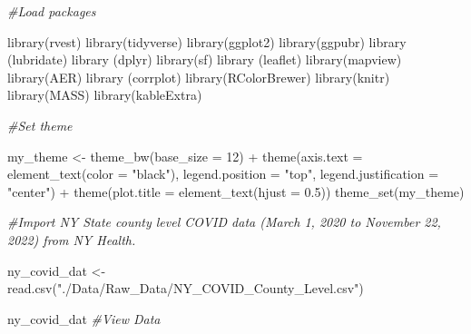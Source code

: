 \documentclass[
  12pt,
]{article}
\newenvironment{Shaded}{\begin{snugshade}}{\end{snugshade}}
\newcommand{\AttributeTok}[1]{\textcolor[rgb]{0.77,0.63,0.00}{#1}}
\newcommand{\CommentTok}[1]{\textcolor[rgb]{0.56,0.35,0.01}{\textit{#1}}}
\newcommand{\DecValTok}[1]{\textcolor[rgb]{0.00,0.00,0.81}{#1}}
\newcommand{\FloatTok}[1]{\textcolor[rgb]{0.00,0.00,0.81}{#1}}
\newcommand{\FunctionTok}[1]{\textcolor[rgb]{0.00,0.00,0.00}{#1}}
\newcommand{\NormalTok}[1]{#1}
\newcommand{\OtherTok}[1]{\textcolor[rgb]{0.56,0.35,0.01}{#1}}
\newcommand{\SpecialCharTok}[1]{\textcolor[rgb]{0.00,0.00,0.00}{#1}}
\newcommand{\StringTok}[1]{\textcolor[rgb]{0.31,0.60,0.02}{#1}}
\begin{document}
\begin{Shaded}
\begin{Highlighting}[]
\CommentTok{\#Load packages}

\FunctionTok{library}\NormalTok{(rvest)}
\FunctionTok{library}\NormalTok{(tidyverse)}
\FunctionTok{library}\NormalTok{(ggplot2)}
\FunctionTok{library}\NormalTok{(ggpubr)}
\FunctionTok{library}\NormalTok{ (lubridate)}
\FunctionTok{library}\NormalTok{ (dplyr)}
\FunctionTok{library}\NormalTok{(sf)}
\FunctionTok{library}\NormalTok{ (leaflet)}
\FunctionTok{library}\NormalTok{(mapview)}
\FunctionTok{library}\NormalTok{(AER)}
\FunctionTok{library}\NormalTok{ (corrplot)}
\FunctionTok{library}\NormalTok{(RColorBrewer)}
\FunctionTok{library}\NormalTok{(knitr)}
\FunctionTok{library}\NormalTok{(MASS)}
\FunctionTok{library}\NormalTok{(kableExtra)}

\CommentTok{\#Set theme}

\NormalTok{my\_theme }\OtherTok{\textless{}{-}} \FunctionTok{theme\_bw}\NormalTok{(}\AttributeTok{base\_size =} \DecValTok{12}\NormalTok{) }\SpecialCharTok{+} 
  \FunctionTok{theme}\NormalTok{(}\AttributeTok{axis.text =} \FunctionTok{element\_text}\NormalTok{(}\AttributeTok{color =} \StringTok{"black"}\NormalTok{), }
      \AttributeTok{legend.position =} \StringTok{"top"}\NormalTok{, }\AttributeTok{legend.justification =} \StringTok{"center"}\NormalTok{) }\SpecialCharTok{+}
  \FunctionTok{theme}\NormalTok{(}\AttributeTok{plot.title =} \FunctionTok{element\_text}\NormalTok{(}\AttributeTok{hjust =} \FloatTok{0.5}\NormalTok{))}
\FunctionTok{theme\_set}\NormalTok{(my\_theme)}


\CommentTok{\#Import NY State county level COVID data (March 1, 2020 to November 22, 2022) from NY Health.}

\NormalTok{ny\_covid\_dat }\OtherTok{\textless{}{-}} \FunctionTok{read.csv}\NormalTok{(}\StringTok{"./Data/Raw\_Data/NY\_COVID\_County\_Level.csv"}\NormalTok{)}

\NormalTok{ny\_covid\_dat }\CommentTok{\#View Data}
\end{Highlighting}
\end{Shaded}
\end{document}
